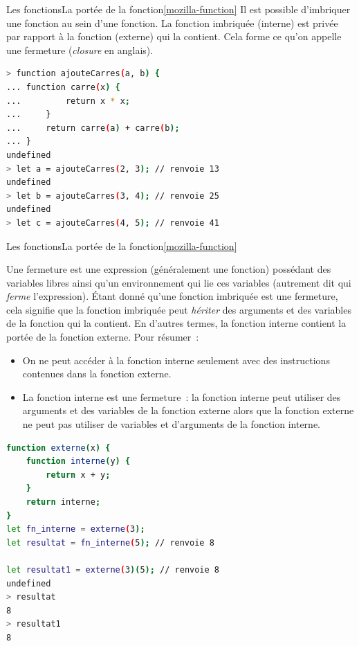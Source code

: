 \documentclass{beamer}
\begin{document}
    \begin{frame}[fragile]{Les fonctions}{La portée de la fonction\cref{mozilla-function}}
        Il est possible d'imbriquer une fonction au sein d'une fonction.
        La fonction imbriquée (interne) est privée par rapport à la fonction (externe) qui la contient.
        Cela forme ce qu'on appelle une fermeture (\textit{closure} en anglais).
        \begin{lstlisting}[language=Bash,title={\scriptsize{Node.js}}]
> function ajouteCarres(a, b) {
... function carre(x) {
...         return x * x;
...     }
...     return carre(a) + carre(b);
... }
undefined
> let a = ajouteCarres(2, 3); // renvoie 13
undefined
> let b = ajouteCarres(3, 4); // renvoie 25
undefined
> let c = ajouteCarres(4, 5); // renvoie 41
        \end{lstlisting}
    \end{frame}

    \begin{frame}[fragile]{Les fonctions}{La portée de la fonction\cref{mozilla-function}}
        \begin{tiny}
            Une fermeture est une expression (généralement une fonction) possédant des variables libres ainsi qu'un environnement qui lie ces variables (autrement dit qui \textit{ferme} l'expression).
            \bigbreak
            Étant donné qu'une fonction imbriquée est une fermeture, cela signifie que la fonction imbriquée peut \textit{hériter} des arguments et des variables de la fonction qui la contient.
            En d'autres termes, la fonction interne contient la portée de la fonction externe.
            \bigbreak
            Pour résumer~:
            \begin{itemize}
                \item On ne peut accéder à la fonction interne seulement avec des instructions
                contenues dans la fonction externe.
                \item La fonction interne est une fermeture~: la fonction interne peut utiliser des
                arguments et des variables de la fonction externe alors que la fonction externe
                ne peut pas utiliser de variables et d'arguments de la fonction interne.
            \end{itemize}
        \end{tiny}
        \begin{lstlisting}[language=Bash,title={\scriptsize{Node.js}}]
function externe(x) {
    function interne(y) {
        return x + y;
    }
    return interne;
}
let fn_interne = externe(3);
let resultat = fn_interne(5); // renvoie 8

let resultat1 = externe(3)(5); // renvoie 8
undefined
> resultat
8
> resultat1
8
        \end{lstlisting}
    \end{frame}
\end{document}
